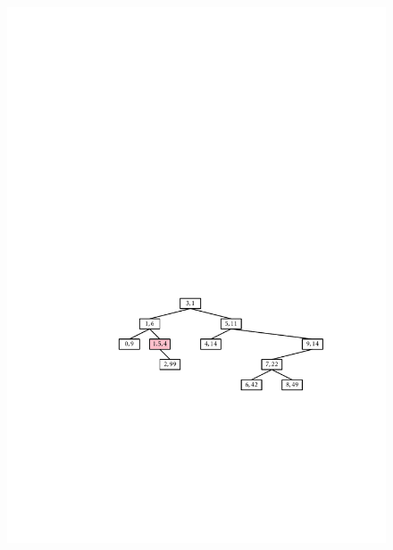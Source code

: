 \begin{figure}
\begin{center}
  \includegraphics[width=\ScaleIfNeeded]{figs/treap-insert-b} \\

\end{center}
\end{figure}
